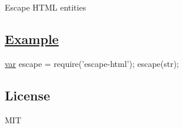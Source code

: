 Escape H\+T\+M\+L entities

\subsection*{\hyperlink{struct_example}{Example}}


\begin{DoxyCode}
\hyperlink{018__def_8c_a335628f2e9085305224b4f9cc6e95ed5}{var} escape = require(\textcolor{stringliteral}{'escape-html'});
escape(str);
\end{DoxyCode}


\subsection*{License}

M\+I\+T 